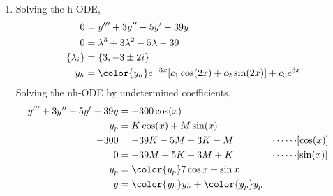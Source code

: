 \begin{enumerate}
    \item Solving the h-ODE,
          \begin{align}
              0               & = y''' + 3y'' - 5y' - 39y                          \\
              0               & = \lambda^{3} + 3\lambda^{2} - 5\lambda - 39       \\
              \{\lambda_{i}\} & = \{3, -3 \pm 2i\}                                 \\
              y_{h}           & = \color{y_h} e^{-3x}[c_1 \cos(2x) + c_2 \sin(2x)]
              + c_3 e^{3x}
          \end{align}
          Solving the nh-ODE by undetermined coefficients,
          \begin{align}
              y''' + 3y'' - 5y' - 39y & = -300\cos(x)                                                          \\
              y_{p}                   & = K\cos(x) + M\sin(x)                                                  \\
              -300                    & = -39K - 5M - 3K - M                        & \cdots\cdots & [\cos(x)] \\
              0                       & = -39M + 5K - 3M + K                        & \cdots\cdots & [\sin(x)] \\
              y_{p}                   & = \color{y_p} 7\cos x + \sin x                                         \\
              y                       & = {\color{y_h} y_{h}} + {\color{y_p} y_{p}}
          \end{align}


\end{enumerate}
